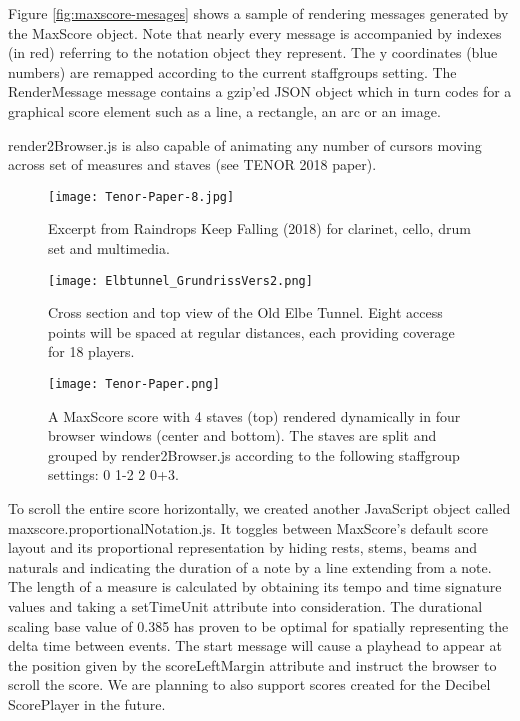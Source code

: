 Figure \ref{fig:maxscore-mesages} shows a sample of rendering messages generated by the MaxScore object. Note that nearly every message is accompanied by indexes (in red) referring to the notation object they represent. The y coordinates (blue numbers) are remapped according to the current staffgroups setting. The RenderMessage message contains a gzip’ed JSON object which in turn codes for a graphical score element such as a line, a rectangle, an arc or an image.

render2Browser.js is also capable of animating any number of cursors moving across set of measures and staves (see TENOR 2018 paper).

\begin{figure}[h!]
        \centering
        \texttt{[image: Tenor-Paper-8.jpg]} 
       	\caption{Excerpt from Raindrops Keep Falling (2018) for clarinet, cello, drum set and multimedia.
\label{fig:Tenor-Paper-8}}
\end{figure}


\begin{figure*}[h]
        \centering
        \texttt{[image: Elbtunnel\_GrundrissVers2.png]} 
       	\caption{Cross section and top view of the Old Elbe Tunnel. Eight access points will be spaced at regular distances, each providing coverage for 18 players.
\label{fig:Elbtunnel_GrundrissVers2}}
\end{figure*}

\begin{figure*}[h]
        \centering
        \texttt{[image: Tenor-Paper.png]} 
       	\caption{A MaxScore score with 4 staves (top) rendered dynamically in four browser windows (center and bottom). The staves are split and grouped by render2Browser.js according to the following staffgroup settings: 0 1-2 2 0+3.
\label{fig:Tenor-Paper}}
\end{figure*}

To scroll the entire score horizontally, we created another JavaScript object called maxscore.proportionalNotation.js. It toggles between MaxScore’s default score layout and its proportional representation by hiding rests, stems, beams and naturals and indicating the duration of a note by a line extending from a note. The length of a measure is calculated by obtaining its tempo and time signature values and taking a setTimeUnit attribute into consideration. The durational scaling base value of 0.385 has proven to be optimal for spatially representing the delta time between events. The start message will cause a playhead to appear at the position given by the scoreLeftMargin attribute and instruct the browser to scroll the score. We are planning to also support scores created for the Decibel ScorePlayer in the future. 



